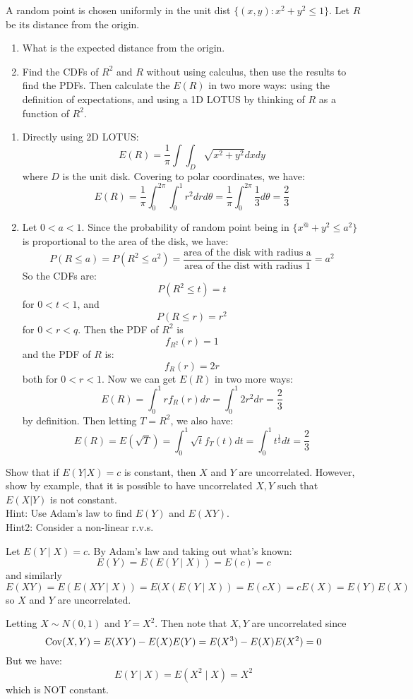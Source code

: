 \documentclass[11pt]{article}
\begin{document}
\begin{exercise}
A random point is chosen uniformly in the unit dist $\{(x,y) : x^2 + y^2 \leq 1\}$. Let $R$ be its distance from the origin.
\begin{enumerate}
\item What is the expected distance from the origin.
\item Find the CDFs of $R^2$ and $R$ without using calculus, then use the results to find the PDFs. Then calculate the $E(R)$ in two more ways: using the definition of expectations, and using a 1D LOTUS by thinking of $R$ as a function of $R^2$.
\end{enumerate}
\end{exercise}
\begin{solution}
\begin{enumerate}
\item Directly using 2D LOTUS:
$$
E(R) = \frac{1}{\pi}\int \int_D \sqrt{x^2 + y^2} dx dy
$$
where $D$ is the unit disk. Covering to polar coordinates, we have:
$$
E(R) = \frac{1}{\pi}\int_{0}^{2\pi}\int_{0}^1 r^2 dr d\theta = \frac{1}{\pi} \int_0^{2\pi} \frac{1}{3}d\theta = \frac{2}{3}
$$
\item Let $0 < a < 1$. Since the probability of random point being in $\{x^@ + y^2 \leq a^2\}$ is proportional to the area of the disk, we have:
$$
P(R \leq a) = P(R^2 \leq a^2) = \frac{\text{area of the disk with radius a}}{\text{area of the dist with radius 1}} = a^2
$$
So the CDFs are:
$$
P(R^2 \leq t) = t
$$
for $0 < t< 1$, and
$$
P(R \leq r) = r^2
$$
for $0 < r < q$. Then the PDF of $R^2$ is
$$
f_{R^2}(r) = 1
$$
and the PDF of $R$ is:
$$
f_R(r) = 2r
$$
both for $0 < r < 1$. Now we can get $E(R)$ in two more ways:
$$
E(R) = \int_0^1 r f_R(r) dr = \int_0^1 2r^2 dr = \frac{2}{3}
$$
by definition. Then letting $T = R^2$, we also have:
$$
E(R) = E(\sqrt{T}) = \int_0^1 \sqrt{t}f_T(t) dt = \int_0^1 t^{\frac{1}{2}} dt = \frac{2}{3}
$$
\end{enumerate}
\end{solution}

\begin{exercise}
Show that if $E(Y|X) = c$ is constant, then $X$ and $Y$ are uncorrelated. However, show by example, that it is possible to have uncorrelated $X,Y$ such that $E(X|Y)$ is not constant. \\
Hint: Use Adam's law to find $E(Y)$ and $E(XY)$.\\
Hint2: Consider a non-linear r.v.s.
\end{exercise}
\begin{solution}
Let $E(Y \mid X) = c$. By Adam's law and taking out what's known:
$$
E(Y) = E(E(Y\mid X)) = E(c) = c
$$
and similarly
$$
E(XY) = E(E(XY \mid X)) = E(X(E(Y\mid X)) = E(cX) = cE(X) = E(Y)E(X)
$$
so $X$ and $Y$ are uncorrelated.

Letting $X \sim N(0,1)$ and $Y = X^2$. Then note that $X,Y$ are uncorrelated since
$$
\textrm{Cov}(X,Y) = E(XY) - E(X)E(Y) = E(X^3) - E(X)E(X^2) = 0
$$
But we have:
$$
E(Y \mid X) = E(X^2 \mid X) = X^2
$$
which is NOT constant.
\end{solution}
\end{document}
